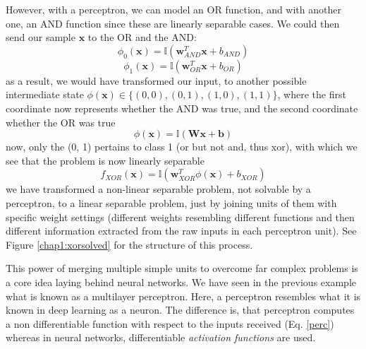 \documentclass[11pt,english,listoffigures,listoftables]{tfgetsinf}
\newcommand{\vect}[1]{\mathbf{#1}}
\begin{document}
However, with a perceptron, we can model an OR function, and with another one, an AND function since these are linearly separable cases. We could then send our sample $\vect{x}$ to the OR and the AND:
\begin{equation}
    \phi_0(\vect{x}) = \mathbb{I}(\vect{w}^T_{AND}\vect{x} + b_{AND})
\end{equation}
\begin{equation}
    \phi_1(\vect{x}) = \mathbb{I}(\vect{w}^T_{OR}\vect{x} + b_{OR})
\end{equation}
as a result, we would have transformed our input, to another possible intermediate state $\phi(\vect{x}) \in \{(0,0), (0,1), (1,0), (1,1)\}$, where the first coordinate now represents whether the AND was true, and the second coordinate whether the OR was true
\begin{equation}
    \phi(\vect{x}) = \mathbb{I}(\vect{W}\vect{x} + \vect{b})
\end{equation}
now, only the (0, 1) pertains to class 1 (or but not and, thus xor), with which we see that the problem is now linearly separable
\begin{equation}
    f_{XOR}(\vect{x})=\mathbb{I}(\vect{w}^T_{XOR}\phi(\vect{x}) + b_{XOR})
\end{equation}
we have transformed a non-linear separable problem, not solvable by a perceptron, to a linear separable problem, just by joining units of them with specific weight settings (different weights resembling different functions and then different information extracted from the raw inputs in each perceptron unit). See Figure \ref{chap1:xorsolved} for the structure of this process.







This power of merging multiple simple units to overcome far complex problems is a core idea laying behind neural networks. We have seen in the previous example what is known as a multilayer perceptron. Here, a perceptron resembles what it is known in deep learning as a neuron. The difference is, that perceptron computes a non differentiable function with respect to the inputs received (Eq. \ref{perc}) whereas in neural networks, differentiable \textit{activation functions} are used.
\end{document}
